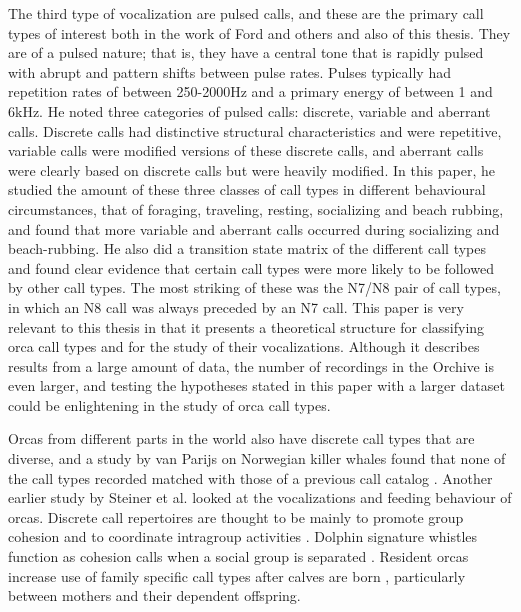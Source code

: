 The third type of vocalization are pulsed calls, and these are the
primary call types of interest both in the work of Ford and others and
also of this thesis.  They are of a pulsed nature; that is, they have
a central tone that is rapidly pulsed with abrupt and pattern shifts
between pulse rates.  Pulses typically had repetition rates of between
250-2000Hz and a primary energy of between 1 and 6kHz.  He noted three
categories of pulsed calls: discrete, variable and aberrant calls.
Discrete calls had distinctive structural characteristics and were
repetitive, variable calls were modified versions of these discrete
calls, and aberrant calls were clearly based on discrete calls but
were heavily modified.  In this paper, he studied the amount of these
three classes of call types in different behavioural circumstances,
that of foraging, traveling, resting, socializing and beach rubbing,
and found that more variable and aberrant calls occurred during
socializing and beach-rubbing.  He also did a transition state matrix
of the different call types and found clear evidence that certain call
types were more likely to be followed by other call types.  The most
striking of these was the N7/N8 pair of call types, in which an N8
call was always preceded by an N7 call.  This paper is very relevant
to this thesis in that it presents a theoretical structure for
classifying orca call types and for the study of their vocalizations.
Although it describes results from a large amount of data, the number
of recordings in the Orchive is even larger, and testing the
hypotheses stated in this paper with a larger dataset could be
enlightening in the study of orca call types.

Orcas from different parts in the world also have discrete call types that
are diverse, and a study by van Parijs \cite{parijs2004norwegian} on
Norwegian killer whales found that none of the call types recorded matched
with those of a previous call catalog \cite{strager1995call}.  Another
earlier study by Steiner et al. \cite{steiner1979vocalizations} looked
at the vocalizations and feeding behaviour of orcas.  Discrete call
repertoires are thought to be mainly to promote group cohesion and to
coordinate intragroup activities \cite{ford1989acoustic}
\cite{ford1991vocal}.  Dolphin signature whistles function as cohesion
calls when a social group is separated \cite{janik1998context}
\cite{watwood2005signature}.  Resident orcas increase use of family
specific call types after calves are born \cite{weiss2006vocal},
particularly between mothers and their dependent offspring.

